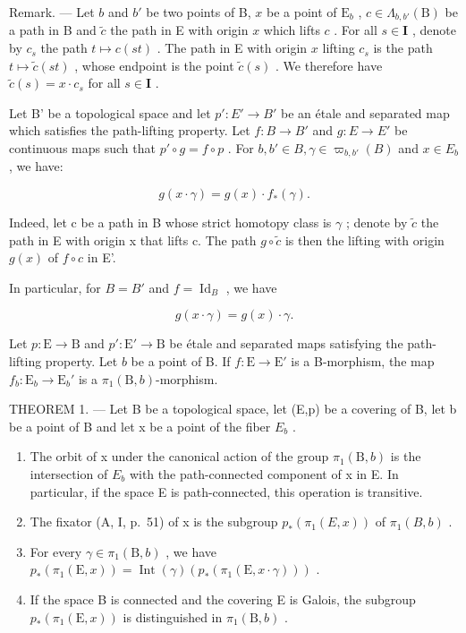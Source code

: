Remark. --- Let \(b\) and \(b'\) be two points of B, \(x\) be a point of \(\mathrm{E}_b\) , \(c \in \Lambda_{b,b'}(\mathrm{B})\) be a path in B and \(\widetilde{c}\) the path in E with origin \(x\) which lifts \(c\) . For all \(s \in \mathbf{I}\) , denote by \(c_s\) the path \(t \mapsto c(st)\) . The path in E with origin \(x\) lifting \(c_s\) is the path \(t \mapsto \widetilde{c}(st)\) , whose endpoint is the point \(\widetilde{c}(s)\) . We therefore have \(\widetilde{c}(s) = x \cdot c_s\) for all \(s \in \mathbf{I}\) .

Let B' be a topological space and let \(p'\colon E'\to B'\) be an étale and separated map which satisfies the path-lifting property. Let \(f\colon B\to B'\) and \(g\colon E\to E'\) be continuous maps such that \(p'\circ g=f\circ p\) . For \(b, b'\in B, \gamma\in\varpi_{b,b'}(B)\) and \(x\in E_b\) , we have:

\[
g (x \cdot \gamma) = g (x) \cdot f _ {*} (\gamma).\tag{3}
\]

Indeed, let c be a path in B whose strict homotopy class is \(\gamma\) ; denote by \(\widetilde{c}\) the path in E with origin x that lifts c. The path \(g \circ \widetilde{c}\) is then the lifting with origin \(g(x)\) of \(f \circ c\) in E'.

In particular, for \(B = B'\) and \(f = \operatorname{Id}_{B}\) , we have

\[
g (x \cdot \gamma) = g (x) \cdot \gamma .\tag{4}
\]

Let \(p \colon \mathrm{E} \to \mathrm{B}\) and \(p' \colon \mathrm{E}' \to \mathrm{B}\) be étale and separated maps satisfying the path-lifting property. Let \(b\) be a point of B. If \(f \colon \mathrm{E} \to \mathrm{E}'\) is a B-morphism, the map \(f_b \colon \mathrm{E}_b \to \mathrm{E}_b'\) is a \(\pi_1(\mathrm{B}, b)\)-morphism.

THEOREM 1. --- Let B be a topological space, let (E,p) be a covering of B, let b be a point of B and let x be a point of the fiber \(E_{b}\) .

\begin{enumerate}
\def\labelenumi{\alph{enumi})}
\item
  The orbit of x under the canonical action of the group \(\pi_{1}(\mathrm{B},b)\) is the intersection of \(E_{b}\) with the path-connected component of x in E. In particular, if the space E is path-connected, this operation is transitive.
\item
  The fixator (A, I, p.~51) of x is the subgroup \(p_{*}(\pi_{1}(E,x))\) of \(\pi_{1}(B,b)\) .
\item
  For every \(\gamma \in \pi_1(\mathrm{B},b)\) , we have \(p_*(\pi_1(\mathrm{E},x)) = \operatorname{Int}(\gamma)(p_*(\pi_1(\mathrm{E},x \cdot \gamma)))\) .
\item
  If the space B is connected and the covering E is Galois, the subgroup \(p_{*}(\pi_{1}(\mathrm{E},x))\) is distinguished in \(\pi_{1}(\mathrm{B},b)\) .
\end{enumerate}


